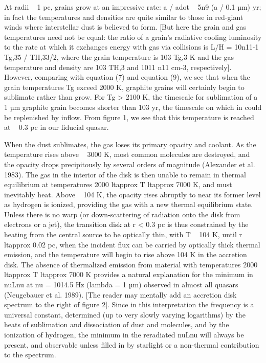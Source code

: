 \documentclass[11pt]{article}
\begin{document}
At radii ~ 1 pc, grains grow at an impressive rate: a / adot ~ 5n9 (a / 0.1 µm) yr; in fact the temperatures and densities are quite similar to those in red-giant winds where interstellar dust is believed to form. [But here the grain and gas temperatures need not be equal: the ratio of a grain's radiative cooling luminosity to the rate at which it exchanges energy with gas via collisions is L/H = 10n11-1 Tg,35 / TH,33/2, where the grain temperature is 103 Tg,3 K and the gas temperature and density are 103 TH,3 and 1011 n11 cm-3, respectively]. However, comparing with equation (7) and equation (9), we see that when the grain temperatures Tg exceed 2000 K, graphite grains will certainly begin to sublimate rather than grow. For Tg > 2100 K, the timescale for sublimation of a 1 µm graphite grain becomes shorter than 103 yr, the timescale on which in could be replenished by inflow. From figure 1, we see that this temperature is reached at ~ 0.3 pc in our fiducial quasar.

When the dust sublimates, the gas loses its primary opacity and coolant. As the temperature rises above ~ 3000 K, most common molecules are destroyed, and the opacity drops precipitously by several orders of magnitude (Alexander et al. 1983). The gas in the interior of the disk is then unable to remain in thermal equilibrium at temperatures 2000 ltapprox T ltapprox 7000 K, and must inevitably heat. Above ~ 104 K, the opacity rises abruptly to near its former level as hydrogen is ionized, providing the gas with a new thermal equilibrium state. Unless there is no warp (or down-scattering of radiation onto the disk from electrons or a jet), the transition disk at r < 0.3 pc is thus constrained by the heating from the central source to be optically thin, with T ~ 104 K, until r ltapprox 0.02 pc, when the incident flux can be carried by optically thick thermal emission, and the temperature will begin to rise above 104 K in the accretion disk. The absence of thermalized emission from material with temperatures 2000 ltapprox T ltapprox 7000 K provides a natural explanation for the minimum in nuLnu at nu = 1014.5 Hz (lambda = 1 µm) observed in almost all quasars (Neugebauer et al. 1989). [The reader may mentally add an accretion disk spectrum to the right of figure 2]. Since in this interpretation the frequency is a universal constant, determined (up to very slowly varying logarithms) by the heats of sublimation and dissociation of dust and molecules, and by the ionization of hydrogen, the minimum in the reradiated nuLnu will always be present, and observable unless filled in by starlight or a non-thermal contribution to the spectrum.
\end{document}

